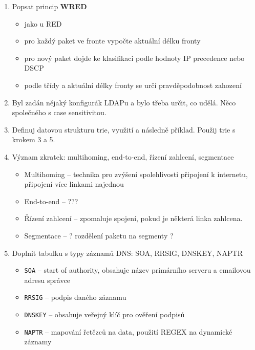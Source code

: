 \documentclass[12pt,a4paper,titlepage,final]{article}
\begin{document}
\begin{enumerate}
\begin{itemize}
	\end{itemize}
	\item Popsat princip \textbf{WRED}
	\begin{itemize}
		\item jako u RED
		\item pro každý paket ve fronte vypočte aktuální délku fronty
		\item pro nový paket dojde ke klasifikaci podle hodnoty IP precedence nebo DSCP
		\item podle třídy a aktuální délky fronty se určí pravděpodobnost zahození
	\end{itemize}

	\item Byl zadán nějaký konfigurák LDAPu a bylo třeba určit, co udělá. Něco společného s case sensitivitou.

	\item Definuj datovou strukturu trie, využití a následně příklad. Použij trie s krokem 3 a 5.

	\item Význam zkratek: multihoming, end-to-end, řízení zahlcení, segmentace
	\begin{itemize}
		\item Multihoming -- technika pro zvýšení spolehlivosti připojení k internetu, připojení více linkami najednou
		\item End-to-end -- ???
		\item Řízení zahlcení -- zpomaluje spojení, pokud je některá linka zahlcena.
		\item Segmentace -- ? rozdělení paketu na segmenty ?
	\end{itemize}

	\item Doplnit tabulku s typy záznamů DNS: SOA, RRSIG, DNSKEY, NAPTR
	\begin{itemize}
		\item \texttt{SOA} -- start of authority, obsahuje název primárního serveru a emailovou adresu správce
		\item \texttt{RRSIG} -- podpis daného záznamu
		\item \texttt{DNSKEY} -- obsahuje veřejný klíč pro ověření podpisů
		\item \texttt{NAPTR} -- mapování řetězců na data, použití REGEX na dynamické záznamy
	\end{itemize}


\end{enumerate}
\end{document}
